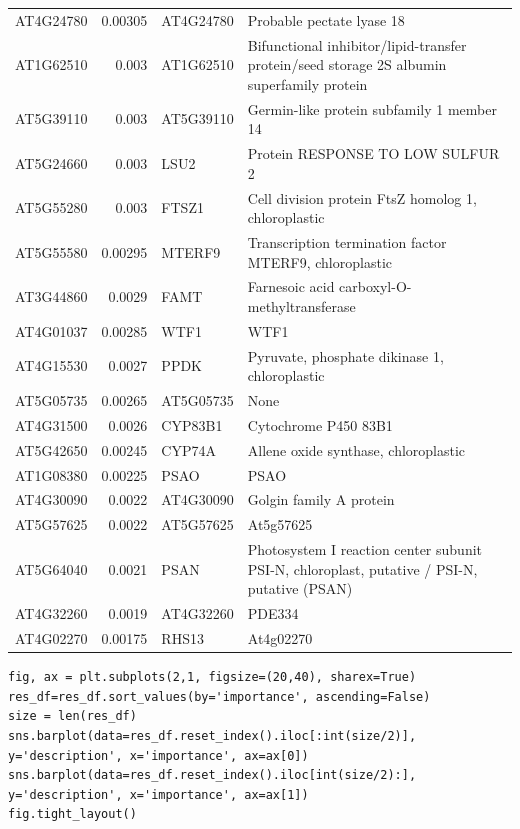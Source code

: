 \documentclass[11pt]{article}
\begin{document}
\begin{center}
\begin{tabular}{lrll}
AT4G24780 & 0.00305 & AT4G24780 & Probable pectate lyase 18\\
AT1G62510 & 0.003 & AT1G62510 & Bifunctional inhibitor/lipid-transfer protein/seed storage 2S albumin superfamily protein\\
AT5G39110 & 0.003 & AT5G39110 & Germin-like protein subfamily 1 member 14\\
AT5G24660 & 0.003 & LSU2 & Protein RESPONSE TO LOW SULFUR 2\\
AT5G55280 & 0.003 & FTSZ1 & Cell division protein FtsZ homolog 1, chloroplastic\\
AT5G55580 & 0.00295 & MTERF9 & Transcription termination factor MTERF9, chloroplastic\\
AT3G44860 & 0.0029 & FAMT & Farnesoic acid carboxyl-O-methyltransferase\\
AT4G01037 & 0.00285 & WTF1 & WTF1\\
AT4G15530 & 0.0027 & PPDK & Pyruvate, phosphate dikinase 1, chloroplastic\\
AT5G05735 & 0.00265 & AT5G05735 & None\\
AT4G31500 & 0.0026 & CYP83B1 & Cytochrome P450 83B1\\
AT5G42650 & 0.00245 & CYP74A & Allene oxide synthase, chloroplastic\\
AT1G08380 & 0.00225 & PSAO & PSAO\\
AT4G30090 & 0.0022 & AT4G30090 & Golgin family A protein\\
AT5G57625 & 0.0022 & AT5G57625 & At5g57625\\
AT5G64040 & 0.0021 & PSAN & Photosystem I reaction center subunit PSI-N, chloroplast, putative / PSI-N, putative (PSAN)\\
AT4G32260 & 0.0019 & AT4G32260 & PDE334\\
AT4G02270 & 0.00175 & RHS13 & At4g02270\\
\end{tabular}
\end{center}

\begin{verbatim}
fig, ax = plt.subplots(2,1, figsize=(20,40), sharex=True)
res_df=res_df.sort_values(by='importance', ascending=False)
size = len(res_df)
sns.barplot(data=res_df.reset_index().iloc[:int(size/2)], y='description', x='importance', ax=ax[0])
sns.barplot(data=res_df.reset_index().iloc[int(size/2):], y='description', x='importance', ax=ax[1])
fig.tight_layout()
\end{verbatim}
\end{document}
